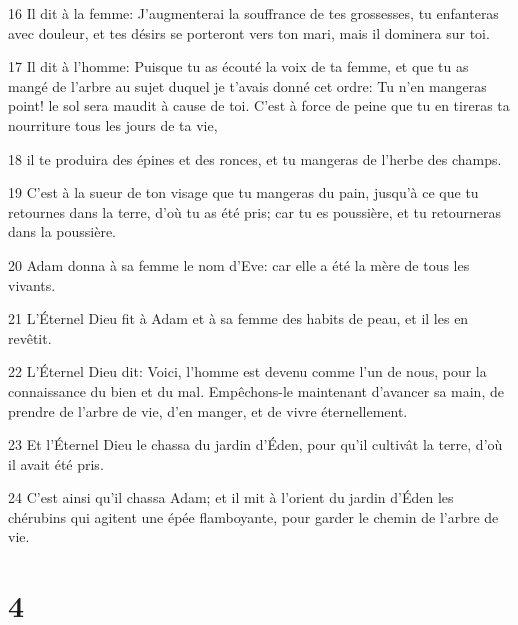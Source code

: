 \par 16 Il dit à la femme: J'augmenterai la souffrance de tes grossesses, tu enfanteras avec douleur, et tes désirs se porteront vers ton mari, mais il dominera sur toi.
\par 17 Il dit à l'homme: Puisque tu as écouté la voix de ta femme, et que tu as mangé de l'arbre au sujet duquel je t'avais donné cet ordre: Tu n'en mangeras point! le sol sera maudit à cause de toi. C'est à force de peine que tu en tireras ta nourriture tous les jours de ta vie,
\par 18 il te produira des épines et des ronces, et tu mangeras de l'herbe des champs.
\par 19 C'est à la sueur de ton visage que tu mangeras du pain, jusqu'à ce que tu retournes dans la terre, d'où tu as été pris; car tu es poussière, et tu retourneras dans la poussière.
\par 20 Adam donna à sa femme le nom d'Eve: car elle a été la mère de tous les vivants.
\par 21 L'Éternel Dieu fit à Adam et à sa femme des habits de peau, et il les en revêtit.
\par 22 L'Éternel Dieu dit: Voici, l'homme est devenu comme l'un de nous, pour la connaissance du bien et du mal. Empêchons-le maintenant d'avancer sa main, de prendre de l'arbre de vie, d'en manger, et de vivre éternellement.
\par 23 Et l'Éternel Dieu le chassa du jardin d'Éden, pour qu'il cultivât la terre, d'où il avait été pris.
\par 24 C'est ainsi qu'il chassa Adam; et il mit à l'orient du jardin d'Éden les chérubins qui agitent une épée flamboyante, pour garder le chemin de l'arbre de vie.

\chapter{4}

